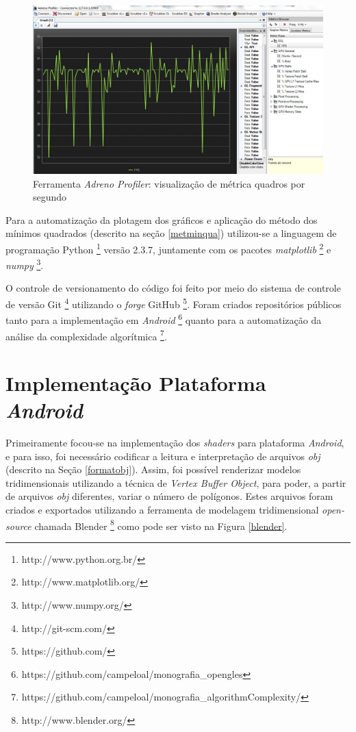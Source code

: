 	\begin{figure}[h]
	\centering
		\includegraphics[keepaspectratio=true,scale=0.35]{figuras/graph.jpg}
	\caption{Ferramenta \textit{Adreno Profiler}: visualização de métrica quadros por segundo}
	\label{graph}
	\end{figure}

	Para a automatização da plotagem dos gráficos e aplicação do método dos mínimos quadrados (descrito na seção \ref{metminqua}) utilizou-se a linguagem de programação Python \footnote{http://www.python.org.br/} versão 2.3.7, juntamente com os pacotes  \textit{matplotlib} \footnote{http://www.matplotlib.org/} e  \textit{numpy} \footnote{http://www.numpy.org/}. 

	O controle de versionamento do código foi feito por meio do sistema de controle de versão Git \footnote{http://git-scm.com/} utilizando o \textit{forge} GitHub \footnote{https://github.com/}. Foram criados repositórios públicos tanto para a implementação em \textit{Android} \footnote{https://github.com/campeloal/monografia\_opengles} quanto para a automatização da análise da complexidade algorítmica \footnote{https://github.com/campeloal/monografia\_algorithmComplexity/}. 

\section{Implementação Plataforma \textit{Android}} 

	Primeiramente focou-se na implementação dos \textit{shaders} para plataforma \textit{Android}, e para isso, foi necessário codificar a leitura e interpretação de arquivos \textit{obj} (descrito na Seção \ref{formatobj}). Assim, foi possível renderizar modelos tridimensionais utilizando a técnica de \textit{Vertex Buffer Object}, para poder, a partir de arquivos \textit{obj} diferentes, variar o número de polígonos. Estes arquivos foram criados e exportados utilizando a ferramenta de modelagem tridimensional \textit{open-source} chamada Blender \footnote{http://www.blender.org/} como pode ser visto na Figura \ref{blender}.

